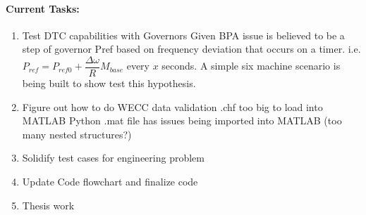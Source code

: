 \documentclass[12pt]{article}
\begin{document}
\begin{multicols}{2}
\paragraph{Current Tasks:}
	\begin{enumerate}
		\itemsep0em 
		\item Test DTC capabilities with Governors
			\subitem Given BPA issue is believed to be a step of governor Pref based on frequency deviation that occurs on a timer. i.e. $P_{ref} = P_{ref0} + \dfrac{\Delta \omega}{R}M_{base} $ every $x$ seconds.
			\subitem A simple six machine scenario is being built to show test this hypothesis. 
		\item Figure out how to do WECC data validation
			\subitem .chf too big to load into MATLAB
			\subitem Python .mat file has issues being imported into MATLAB (too many nested structures?)
		\item Solidify test cases for engineering problem
		\item Update Code flowchart and finalize code%
		\item Thesis work 

\end{enumerate}

\end{multicols}
\end{document}
